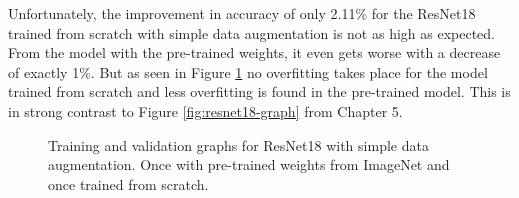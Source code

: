 \begin{table}[!h] \centering
{}
\caption{Cropping, resizing and  random flipping performed on the ResNet18 architecture with and without transfer learning. The first row is a run with the original configuration without any randomness or cropping and serves as comparison.}
\label{tbl:ResNet18_cropping}
\end{table}

Unfortunately, the improvement in accuracy of only 2.11\% for the ResNet18 trained from scratch with simple data augmentation is not as high as expected. From the model with the pre-trained weights, it even gets worse with a decrease of exactly 1\%. But as seen in Figure \ref{fig:resnet18-da-graph} no overfitting takes place for the model trained from scratch and less overfitting is found in the pre-trained model. This is in strong contrast to Figure \ref{fig:resnet18-graph} from Chapter 5.

\begin{figure}[!h]
\centering
\caption{Training and validation graphs for ResNet18 with simple data augmentation. Once with pre-trained weights from ImageNet and once trained from scratch.}
\label{fig:resnet18-da-graph}
\end{figure}

